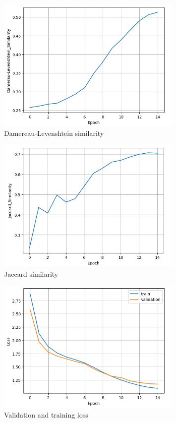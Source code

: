 \documentclass{article}
\begin{document}
\begin{figure}[H]
    \centering
    \includegraphics[width=0.8\textwidth]{../report/plots/RNN-dl-similarity.png}
    \caption{Damereau-Levenshtein similarity}
    \label{fig:rnn-dl-similarity}
\end{figure}

\begin{figure}[H]
    \centering
    \includegraphics[width=0.8\textwidth]{../report/plots/RNN-jaccard-similarity.png}
    \caption{Jaccard similarity}
    \label{fig:rnn-jaccard-similarity}
\end{figure}

\begin{figure}[H]
    \centering
    \includegraphics[width=0.8\textwidth]{../report/plots/RNN-valid-train-loss.png}
    \caption{Validation and training loss}
    \label{fig:rnn-valid-train-loss}
\end{figure}
\end{document}

